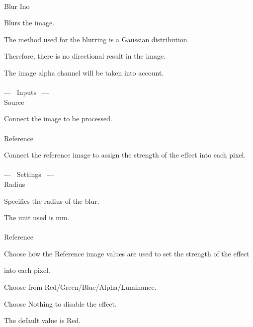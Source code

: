 \documentclass[a4paper,12pt]{article}
\begin{document}
\thispagestyle{empty}

\Large
\noindent \\
Blur Ino\medskip
\par
\normalsize
Blurs the image.\par
The method used for the blurring is a Gaussian distribution.\par
Therefore, there is no directional result in the image.\\
\par
The image alpha channel will be taken into account.\\
\\
-{-}- \ Inputs \ -{-}-\\
Source\par
Connect the image to be processed.\\
\\
Reference\par
Connect the reference image to assign the strength of the effect into each pixel.\\
\\
-{-}- \ Settings \ -{-}-\\
Radius\par
Specifies the radius of the blur.\par
The unit used is mm.\\
\\
Reference\par
Choose how the Reference image values are used to set the strength of the effect\par 
into each pixel.\par
Choose from Red/Green/Blue/Alpha/Luminance.\par
Choose Nothing to disable the effect.\par
The default value is Red.
\end{document}
